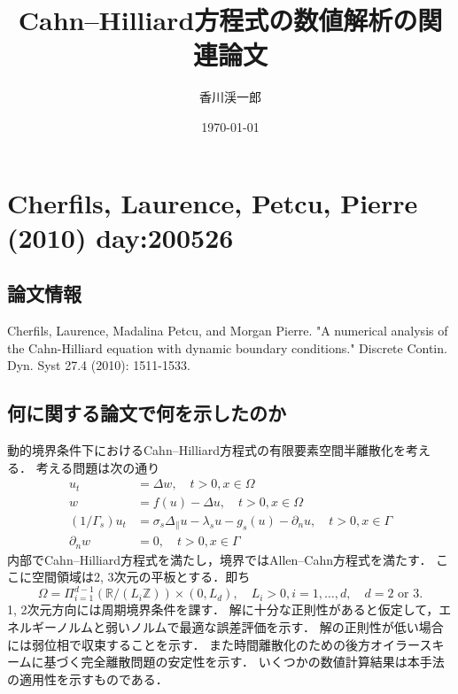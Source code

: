 \documentclass[openary, a4paper, oneside]{jsarticle}
\begin{document}
\title{Cahn--Hilliard方程式の数値解析の関連論文}
\author{香川渓一郎}
\date{\today}
\maketitle
\setcounter{tocdepth}{1}
\tableofcontents

\section{Cherfils, Laurence, Petcu, Pierre (2010) day:200526}
    \subsection{論文情報}
    Cherfils, Laurence, Madalina Petcu, and Morgan Pierre. "A numerical analysis of the Cahn-Hilliard equation with dynamic boundary conditions." Discrete Contin. Dyn. Syst 27.4 (2010): 1511-1533.
    \subsection{何に関する論文で何を示したのか}
    動的境界条件下におけるCahn--Hilliard方程式の有限要素空間半離散化を考える．
    考える問題は次の通り
    \begin{equation}
      \begin{aligned}
      u_{t} &=\Delta w, \quad t>0, x \in \Omega \\
      w &=f(u)-\Delta u, \quad t>0, x \in \Omega \\
      \left(1 / \Gamma_{s}\right) u_{t} &=\sigma_{s} \Delta_{\|} u-\lambda_{s} u-g_{s}(u)-\partial_{n} u, \quad t>0, x \in \Gamma \\
      \partial_{n} w &=0, \quad t>0, x \in \Gamma
      \end{aligned}
    \end{equation}
    内部でCahn--Hilliard方程式を満たし，境界ではAllen--Cahn方程式を満たす．
    ここに空間領域は2, 3次元の平板とする．即ち
    \begin{equation}
      \Omega=\Pi_{i=1}^{d-1}\left(\mathbb{R} /\left(L_{i} \mathbb{Z}\right)\right) \times\left(0, L_{d}\right), \quad L_{i}>0, i=1, \ldots, d, \quad d=2 \text { or } 3.
    \end{equation}
    1, 2次元方向には周期境界条件を課す．
    解に十分な正則性があると仮定して，エネルギーノルムと弱いノルムで最適な誤差評価を示す．
    解の正則性が低い場合には弱位相で収束することを示す．
    また時間離散化のための後方オイラースキームに基づく完全離散問題の安定性を示す．
    いくつかの数値計算結果は本手法の適用性を示すものである．
\end{document}
